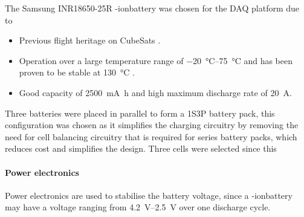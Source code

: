 \documentclass[a4paper,11pt]{article}
\newcommand{\liion}{\ce{Li}-ion}
\begin{document}
The Samsung INR18650-25R \liion battery was chosen for the DAQ platform due to
\begin{itemize}
  \item Previous flight heritage on CubeSats \cite{marcelino2021orbit}.
  \item Operation over a large temperature range of \SIrange{-20}{75}{\degreeCelsius} and has been proven to be stable at \SI{130}{\degreeCelsius} \cite{samsung2014}.
  \item Good capacity of \SI{2500}{\milli\ampere\hour} and high maximum discharge rate of \SI{20}{\ampere}.
\end{itemize}

Three batteries were placed in parallel to form a 1S3P battery pack, this configuration was chosen as it simplifies the charging circuitry by removing the need for cell balancing circuitry that is required for series battery packs, which reduces cost and simplifies the design. Three cells were selected since this %

\paragraph{Power electronics} Power electronics are used to stabilise the battery voltage, since a \liion battery may have a voltage ranging from \SIrange{4.2}{2.5}{\volt} over one discharge cycle.
\end{document}
